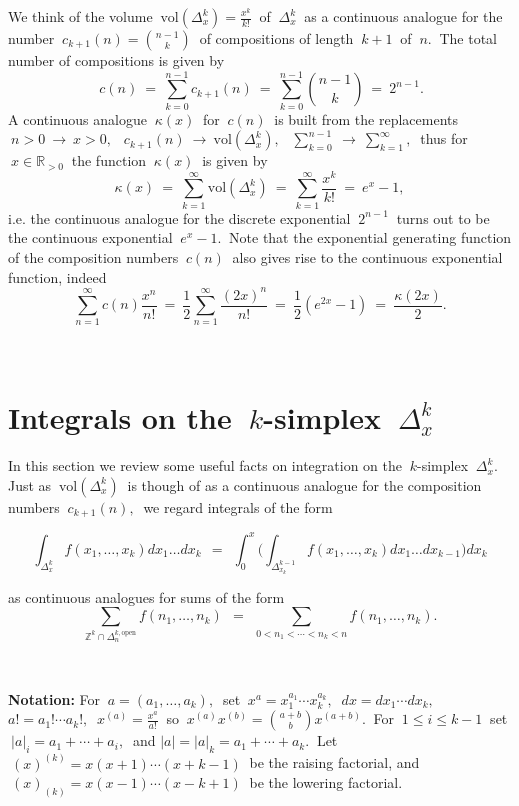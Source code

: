 \documentclass[10pt,leqeq]{article}
\begin{document}
We think of the volume $\ \displaystyle \mathrm{vol}(\Delta^k_x)= \frac{x^k}{k!}\ $ of $\ \Delta^k_x \ $ as a continuous analogue for the number 
$\ \displaystyle c_{k+1}(n)= \binom{n-1}{k} \ $ of compositions of length $\ k+1 \ $ of $\ n. \ $  The total number of compositions is given by  
$$\ c(n)\ = \  \sum_{k=0}^{n-1} c_{k+1}(n) \ = \ \sum_{k=0}^{n-1}\binom{n-1}{k} \ = \ 2^{n-1}.  $$ 
A continuous analogue $\ \kappa(x) \ $ for $\ c(n) \ $ is built from the replacements
$\ n >0 \ \rightarrow \ x>0, \  $ $\ c_{k+1}(n) \ \rightarrow \ \mathrm{vol}(\Delta^k_x) ,\ $ $\ \sum_{k=0}^{n-1}\ \rightarrow \ \sum_{k=1}^{\infty}, \ $
thus for $\ x\in \mathbb{R}_{> 0}\ $ the function $\ \kappa(x) \ $  is given by
$$\kappa(x)\ = \ \sum_{k=1}^{\infty}\mathrm{vol}(\Delta^k_x) \ = \  \sum_{k=1}^{\infty}\frac{x^k}{k!} \ =  \ e^{x}-1,$$
i.e. the continuous analogue for the discrete exponential  
$\ 2^{n-1} \ $ turns out to be the continuous exponential
$\ e^{x}-1. \ $ Note that the exponential generating function of the composition numbers  $\ c(n) \ $ also gives rise to the continuous exponential function, indeed
$$\sum_{n=1}^{\infty}c(n)\frac{x^{n} }{n!} \ = \ \frac{1}{2} \sum_{n=1}^{\infty}\frac{(2x)^{n}}{n!} \ = \ \frac{1}{2} (e^{2x}-1)
\ = \ \frac{\kappa(2x)}{2}  .$$

\


\section{Integrals on the $\ k$-simplex $\ \Delta^k_x$} 

In this section we review some useful facts on integration on the $\ k$-simplex $\ \Delta^k_x . \ $
Just as $\ \mathrm{vol}(\Delta^k_x) \ $ is though of as a continuous analogue for the composition numbers  $\  c_{k+1}(n), \ $  we regard integrals of the form

$$\int_{\Delta^k_x}f(x_1,\dots,x_k)dx_1\dots dx_k \ \ = \ \ 
\int_{0}^{x}\bigg(\int_{\Delta^{k-1}_{x_{k}}}f(x_1,\dots,x_k)dx_1\dots dx_{k-1} \bigg) dx_k  $$

\noindent as continuous analogues for sums of the form $$\sum_{\mathbb{Z}^k \cap \Delta^{k,\mathrm{open}}_n} f(n_1,\dots,n_k)\ \ = \ \ \sum_{0< n_1 < \cdots < n_k<n} f(n_1,\dots,n_k).$$

\

\noindent \textbf{Notation:} For $\ a=(a_1,\dots,a_k), \ $  set $\ x^a=x_1^{a_1}\cdots x_k^{a_k},\ $
$ dx=dx_1\cdots dx_k, \ $ $ a!=a_1!\cdots a_k!,\ $ $ x^{(a)}=\frac{x^a}{a!} \ $ so  $\ x^{(a)}x^{(b)}=\binom{a+b}{b}x^{(a+b)}. \ $ For $\ 1 \leq i \leq k-1 \ $
set $\ |a|_i=a_1+\cdots + a_i, \ $ and $|a|=|a|_k = a_1+\cdots + a_k.\ $
Let $\ (x)^{(k)}=x(x+1)\cdots (x+k-1)\ $ be the raising factorial, and 
$\ (x)_{(k)}=x(x-1)\cdots (x-k+1)\ $  be the lowering factorial.\\
\end{document}
